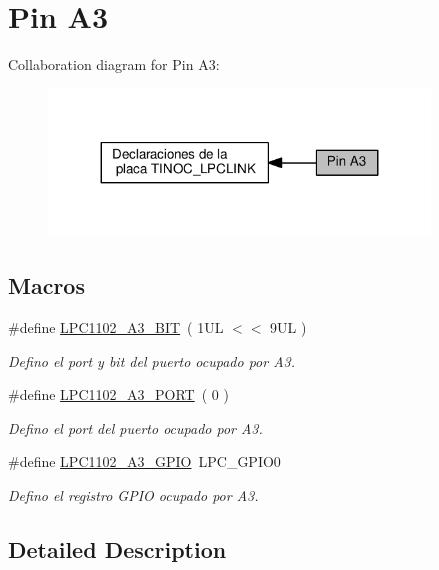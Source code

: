 \hypertarget{group___p_i_n_a3}{}\section{Pin A3}
\label{group___p_i_n_a3}
Collaboration diagram for Pin A3\+:\nopagebreak
\begin{figure}[H]
\begin{center}
\leavevmode
\includegraphics[width=287pt]{group___p_i_n_a3}
\end{center}
\end{figure}
\subsection*{Macros}
\begin{DoxyCompactItemize}
\item 
\#define \hyperlink{group___p_i_n_a3_ga42cf8ceb71f191c96859d8cbc3850b45}{L\+P\+C1102\+\_\+\+A3\+\_\+\+B\+IT}~( 1\+U\+L $<$$<$ 9\+U\+L )
\begin{DoxyCompactList}\small\item\em Defino el port y bit del puerto ocupado por A3. \end{DoxyCompactList}\item 
\#define \hyperlink{group___p_i_n_a3_ga5078bdf03502964ece28e1594df9a997}{L\+P\+C1102\+\_\+\+A3\+\_\+\+P\+O\+RT}~( 0 )
\begin{DoxyCompactList}\small\item\em Defino el port del puerto ocupado por A3. \end{DoxyCompactList}\item 
\#define \hyperlink{group___p_i_n_a3_ga10234a1267cbec06f769ec87765df961}{L\+P\+C1102\+\_\+\+A3\+\_\+\+G\+P\+IO}~L\+P\+C\+\_\+\+G\+P\+I\+O0
\begin{DoxyCompactList}\small\item\em Defino el registro G\+P\+IO ocupado por A3. \end{DoxyCompactList}\end{DoxyCompactItemize}


\subsection{Detailed Description}


